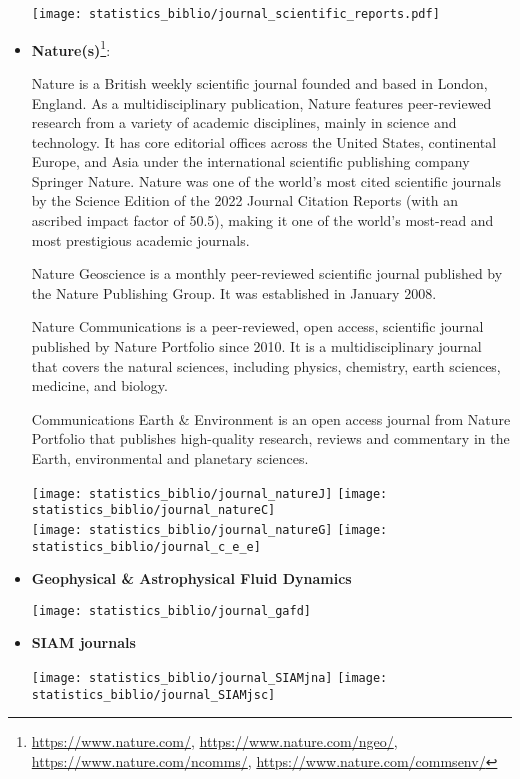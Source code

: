 \begin{itemize}
\begin{center}
\texttt{[image: statistics\_biblio/journal\_scientific\_reports.pdf]}
\end{center}

\item {\bf Nature(s)}\footnote{
\url{https://www.nature.com/},
\url{https://www.nature.com/ngeo/},
\url{https://www.nature.com/ncomms/},
\url{https://www.nature.com/commsenv/}
}:

Nature is a British weekly scientific journal founded and based in London, England. 
As a multidisciplinary publication, Nature features peer-reviewed research from a variety of 
academic disciplines, mainly in science and technology. It has core editorial offices across the 
United States, continental Europe, and Asia under the international scientific publishing company 
Springer Nature. Nature was one of the world's most cited scientific journals by the Science Edition 
of the 2022 Journal Citation Reports (with an ascribed impact factor of 50.5), making it one of the world's most-read and most prestigious academic journals.

Nature Geoscience is a monthly peer-reviewed scientific journal published by the Nature Publishing Group. 
It was established in January 2008. 

Nature Communications is a peer-reviewed, open access, scientific journal published by Nature Portfolio since 2010. 
It is a multidisciplinary journal that covers the natural sciences, including physics, chemistry, earth sciences, 
medicine, and biology.

Communications Earth \& Environment is an open access journal from Nature Portfolio that publishes 
high-quality research, reviews and commentary in the Earth, environmental and planetary sciences. 

\begin{center}
\texttt{[image: statistics\_biblio/journal\_natureJ]}
\texttt{[image: statistics\_biblio/journal\_natureC]}\\
\texttt{[image: statistics\_biblio/journal\_natureG]}
\texttt{[image: statistics\_biblio/journal\_c\_e\_e]}
\end{center}

\item {\bf Geophysical \& Astrophysical Fluid Dynamics} 

\begin{center}
\texttt{[image: statistics\_biblio/journal\_gafd]}
\end{center}

 
\item {\bf SIAM journals} 

\begin{center}
\texttt{[image: statistics\_biblio/journal\_SIAMjna]}
\texttt{[image: statistics\_biblio/journal\_SIAMjsc]}
\end{center}

 





\end{itemize}




